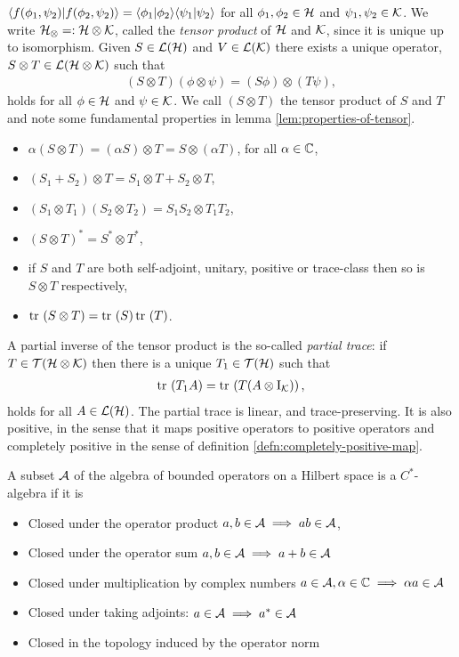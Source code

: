 $\langle f(\phi_1,\psi_2)|f(\phi_2,\psi_2)\rangle = \langle \phi_1|\phi_2\rangle\langle \psi_1|\psi_2\rangle$ for all $\phi_1,\phi_2\in\mathcal{H}$ and $\psi_1,\psi_2\in\mathcal{K}$. We write $\mathcal{H}_\otimes =: \mathcal{H}\otimes\mathcal{K}$, called the \emph{tensor product} of $\mathcal{H}$ and $\mathcal{K}$, since it is unique up to isomorphism. Given $S\in\bops[\hcal]$ and $V\in\bops[\kcal]$ there exists a unique operator, $S\otimes T\in\bops[\hcal\otimes\kcal]$ such that 
\begin{align}
  (S\otimes T)(\phi\otimes\psi) = (S\phi)\otimes(T\psi),
\end{align}
holds for all $\phi\in\mathcal{H}$ and $\psi\in\mathcal{K}$. We call  $(S\otimes T)$ the tensor product of $S$ and $T$ and note some fundamental properties in lemma \ref{lem:properties-of-tensor}.
\begin{lem}\label{lem:properties-of-tensor}\leavevmode
\begin{itemize}
  \item $\alpha(S\otimes T) = (\alpha S)\otimes T = S\otimes(\alpha T)$, for all $\alpha\in\mathbb{C}$,
  \item $(S_1 + S_2)\otimes T = S_1\otimes T + S_2 \otimes T$,
  \item $(S_1\otimes T_1)(S_2\otimes T_2) = S_1S_2 \otimes T_1 T_2$,
  \item $(S\otimes T)^* = S^*\otimes T^*$,
  \item if $S$ and $T$ are both self-adjoint, unitary, positive or trace-class then so is $S\otimes T$ respectively,
  \item $\tr{S\otimes T} = \tr{S}\tr{T}$.
\end{itemize}
\end{lem}
A partial inverse of the tensor product is the so-called \emph{partial trace}: if $T\in\trops[\hcal\otimes\kcal]$ then there is a unique $T_1\in\trops[\hcal]$ such that
\begin{align}
  \tr{T_1 A} = \tr{T(A\otimes \opi_\kcal)},
\end{align}
holds for all $A\in \bops[\hcal]$. The partial trace is linear, and trace-preserving. It is also positive, in the sense that it maps positive operators to positive operators and completely positive in the sense of definition \ref{defn:completely-positive-map}.

\begin{defn}\label{defn:c-star-algebra}
  A subset $\mathcal{A}$ of the algebra of bounded operators on a Hilbert space is a $C^*$-algebra if it is
  \begin{itemize}
    \item Closed under the operator product $a,b\in\mathcal{A}\implies ab\in\mathcal{A}$,
    \item Closed under the operator sum $a,b\in\mathcal{A}\implies a+b\in\mathcal{A}$
    \item Closed under multiplication by complex numbers $a\in\mathcal{A}, \alpha\in\mathbb{C} \implies \alpha a \in \mathcal{A}$
    \item Closed under taking adjoints: $a\in\mathcal{A} \implies a^*\in\mathcal{A}$
    \item Closed in the  topology induced by the operator norm
  \end{itemize}
\end{defn}

